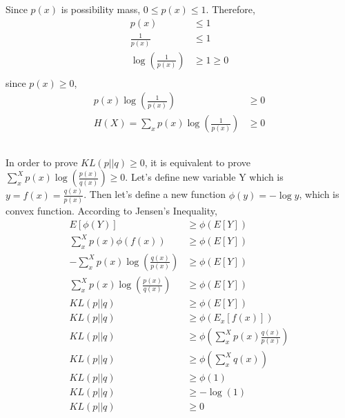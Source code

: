 \documentclass{article}
\begin{document}
\section{}
\subsection{}
Since $p(x)$ is possibility mass, $0\leq p(x)\leq 1$. Therefore,
\begin{align*}
    p(x)&\leq 1\\
    \frac{1}{p(x)} &\leq 1\\
    \log (\frac{1}{p(x)}) &\geq 1 \geq 0\\
\end{align*}
since $p(x) \geq 0$,
\begin{align*}
    p(x)\log (\frac{1}{p(x)}) &\geq 0\\
    H(X) = \sum_{x}^{} p(x) \log (\frac{1}{p(x)}) &\geq 0
\end{align*}
\subsection{}
In order to prove $KL(p||q)\geq 0$, it is equivalent to prove $\sum_{x}^{X}p(x)\log (\frac{p(x)}{q(x)})\geq 0$. Let's define new variable Y which is $y=f(x)=\frac{q(x)}{p(x)}$. Then let's define a new function $\phi(y)=-\log y$, which is convex function. According to Jensen's Inequality,
\begin{align*}
    E[\phi(Y)] &\geq \phi(E[Y])\\
    \sum_{x}^{X}p(x)\phi(f(x)) &\geq \phi(E[Y])\\
    -\sum_{x}^{X}p(x)\log(\frac{q(x)}{p(x)}) &\geq \phi(E[Y])\\
    \sum_{x}^{X}p(x)\log(\frac{p(x)}{q(x)}) &\geq \phi(E[Y])\\
    KL(p||q) &\geq \phi(E[Y])\\
    KL(p||q) &\geq \phi(E_x[f(x)])\\
    KL(p||q) &\geq \phi(\sum_{x}^{X}p(x)\frac{q(x)}{p(x)})\\
    KL(p||q) &\geq \phi(\sum_{x}^{X}q(x))\\
    KL(p||q) &\geq \phi(1)\\
    KL(p||q) &\geq -\log(1)\\
    KL(p||q) &\geq 0
\end{align*}
\end{document}
